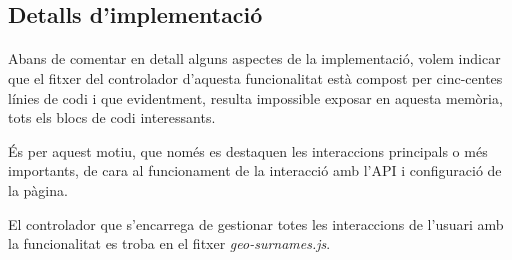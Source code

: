 \subsection{Detalls d'implementació}

    \paragraph{}
    Abans de comentar en detall alguns aspectes de la implementació, volem indicar que el fitxer del controlador d'aquesta funcionalitat està compost per cinc-centes línies de codi i que evidentment, resulta impossible exposar en aquesta memòria, tots els blocs de codi interessants.

    És per aquest motiu, que només es destaquen les interaccions principals o més importants, de cara al funcionament de la interacció amb l'API i configuració de la pàgina.

    El controlador que s'encarrega de gestionar totes les interaccions de l'usuari amb la funcionalitat es troba en el fitxer \emph{geo-surnames.js}.

    
    
    
    
